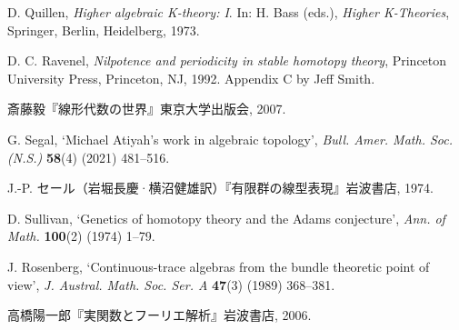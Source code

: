 \noindent [49] D. Quillen, \textit{Higher algebraic K-theory: I}. In: H. Bass (eds.), \textit{Higher K-Theories}, Springer, Berlin, Heidelberg, 1973.

\noindent [50] D. C. Ravenel, \textit{Nilpotence and periodicity in stable homotopy theory}, Princeton University Press, Princeton, NJ, 1992. Appendix C by Jeff Smith.

\noindent [51] 斎藤毅『線形代数の世界』東京大学出版会, 2007.

\noindent [52] G. Segal, `Michael Atiyah's work in algebraic topology', \textit{Bull. Amer. Math. Soc. (N.S.)} \textbf{58}(4) (2021) 481--516.

\noindent [53] J.-P. セール（岩堀長慶·横沼健雄訳）『有限群の線型表現』岩波書店, 1974.

\noindent [54] D. Sullivan, `Genetics of homotopy theory and the Adams conjecture', \textit{Ann. of Math.} \textbf{100}(2) (1974) 1--79.

\noindent [55] J. Rosenberg, `Continuous-trace algebras from the bundle theoretic point of view', \textit{J. Austral. Math. Soc. Ser. A} \textbf{47}(3) (1989) 368--381.

\noindent [56] 高橋陽一郎『実関数とフーリエ解析』岩波書店, 2006.
\endgroup
